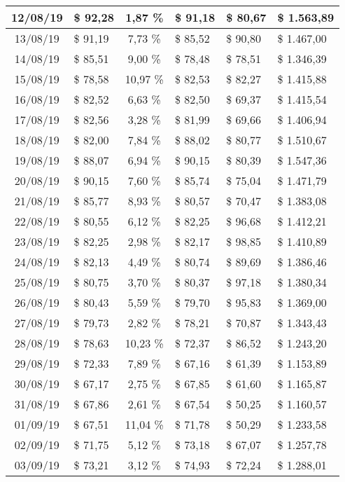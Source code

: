 \begin{center}
\begin{small}
\begin{longtable}{|c|l|c|l|l|l|}
12/08/19 & \$ 92,28 & 1,87 \% & \$ 91,18 & \$ 80,67 & \$ 1.563,89 \\ \hline
13/08/19 & \$ 91,19 & 7,73 \% & \$ 85,52 & \$ 90,80 & \$ 1.467,00 \\ \hline
14/08/19 & \$ 85,51 & 9,00 \% & \$ 78,48 & \$ 78,51 & \$ 1.346,39 \\ \hline
15/08/19 & \$ 78,58 & 10,97 \% & \$ 82,53 & \$ 82,27 & \$ 1.415,88 \\ \hline
16/08/19 & \$ 82,52 & 6,63 \% & \$ 82,50 & \$ 69,37 & \$ 1.415,54 \\ \hline
17/08/19 & \$ 82,56 & 3,28 \% & \$ 81,99 & \$ 69,66 & \$ 1.406,94 \\ \hline
18/08/19 & \$ 82,00 & 7,84 \% & \$ 88,02 & \$ 80,77 & \$ 1.510,67 \\ \hline
19/08/19 & \$ 88,07 & 6,94 \% & \$ 90,15 & \$ 80,39 & \$ 1.547,36 \\ \hline
20/08/19 & \$ 90,15 & 7,60 \% & \$ 85,74 & \$ 75,04 & \$ 1.471,79 \\ \hline
21/08/19 & \$ 85,77 & 8,93 \% & \$ 80,57 & \$ 70,47 & \$ 1.383,08 \\ \hline
22/08/19 & \$ 80,55 & 6,12 \% & \$ 82,25 & \$ 96,68 & \$ 1.412,21 \\ \hline
23/08/19 & \$ 82,25 & 2,98 \% & \$ 82,17 & \$ 98,85 & \$ 1.410,89 \\ \hline
24/08/19 & \$ 82,13 & 4,49 \% & \$ 80,74 & \$ 89,69 & \$ 1.386,46 \\ \hline
25/08/19 & \$ 80,75 & 3,70 \% & \$ 80,37 & \$ 97,18 & \$ 1.380,34 \\ \hline
26/08/19 & \$ 80,43 & 5,59 \% & \$ 79,70 & \$ 95,83 & \$ 1.369,00 \\ \hline
27/08/19 & \$ 79,73 & 2,82 \% & \$ 78,21 & \$ 70,87 & \$ 1.343,43 \\ \hline
28/08/19 & \$ 78,63 & 10,23 \% & \$ 72,37 & \$ 86,52 & \$ 1.243,20 \\ \hline
29/08/19 & \$ 72,33 & 7,89 \% & \$ 67,16 & \$ 61,39 & \$ 1.153,89 \\ \hline
30/08/19 & \$ 67,17 & 2,75 \% & \$ 67,85 & \$ 61,60 & \$ 1.165,87 \\ \hline
31/08/19 & \$ 67,86 & 2,61 \% & \$ 67,54 & \$ 50,25 & \$ 1.160,57 \\ \hline
01/09/19 & \$ 67,51 & 11,04 \% & \$ 71,78 & \$ 50,29 & \$ 1.233,58 \\ \hline
02/09/19 & \$ 71,75 & 5,12 \% & \$ 73,18 & \$ 67,07 & \$ 1.257,78 \\ \hline
03/09/19 & \$ 73,21 & 3,12 \% & \$ 74,93 & \$ 72,24 & \$ 1.288,01 \\ \hline

\end{longtable}
\end{small}
\end{center}
